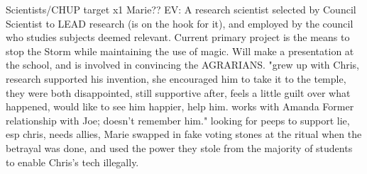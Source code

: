 \documentclass[char]{GL2020}
\begin{document}
\name{\cHeadScientist{}}








Scientists/CHUP target x1 Marie?? EV: A research scientist selected by Council Scientist to LEAD research (is on the hook for it), and employed by the council who studies subjects deemed relevant.  Current primary project is the means to stop the Storm while maintaining the use of magic.  Will make a presentation at the school, and is involved in convincing the AGRARIANS.	"grew up with Chris, research supported his invention, she encouraged him to take it to the temple, they were both disappointed, still supportive after, feels a little guilt over what happened, would like to see him happier, help him.  works with Amanda
Former relationship with Joe; doesn't remember him."	looking for peeps to support lie, esp chris, needs allies, Marie swapped in fake voting stones at the ritual when the betrayal was done, and used the power they stole from the majority of students to enable Chris's tech illegally.
\end{document}
